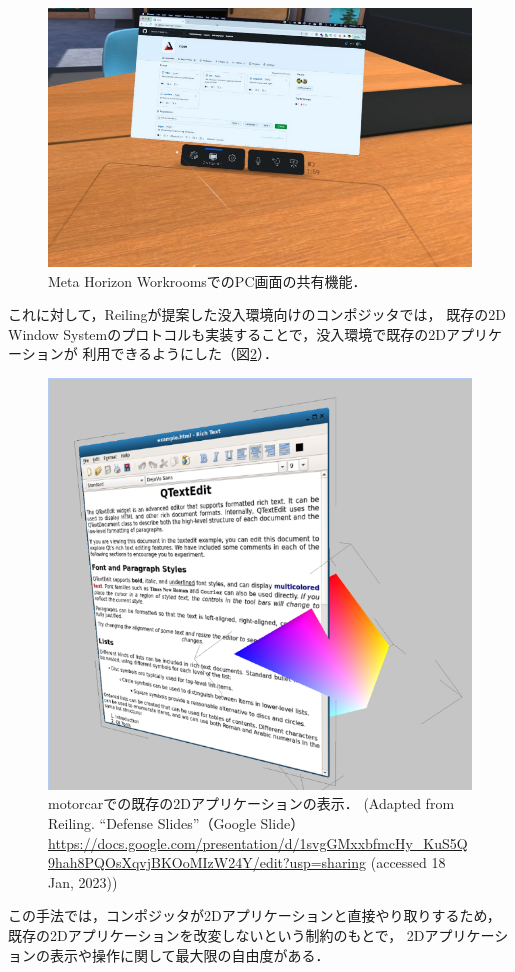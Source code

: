 \begin{figure}[htbp]
  \centering
  \includegraphics[keepaspectratio, width=0.7\linewidth]{figures/share-2d-window.png}
  \caption{
    Meta Horizon WorkroomsでのPC画面の共有機能．
  }
  \label{fig:share-2d-window}
\end{figure}

これに対して，Reiling\cite{reiling}が提案した没入環境向けのコンポジッタでは，
既存の2D Window Systemのプロトコルも実装することで，没入環境で既存の2Dアプリケーションが
利用できるようにした（図\ref{fig:reiling-2d}）．

\begin{figure}[htbp]
  \centering
  \includegraphics[keepaspectratio, width=0.7\linewidth]{figures/reiling-2d.png}
  \caption{
    motorcar\cite{reiling}での既存の2Dアプリケーションの表示．
    (Adapted from Reiling. ``Defense Slides''（Google Slide） \url{https://docs.google.com/presentation/d/1svgGMxxbfmcHy_KuS5Q9hah8PQOsXqvjBKOoMIzW24Y/edit?usp=sharing} (accessed 18 Jan, 2023))
  }
  \label{fig:reiling-2d}
\end{figure}

この手法では，コンポジッタが2Dアプリケーションと直接やり取りするため，
既存の2Dアプリケーションを改変しないという制約のもとで，
2Dアプリケーションの表示や操作に関して最大限の自由度がある．

